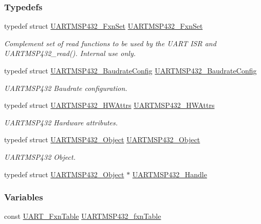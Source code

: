 \subsubsection*{Typedefs}
\begin{DoxyCompactItemize}
\item 
typedef struct \hyperlink{struct_u_a_r_t_m_s_p432___fxn_set}{U\+A\+R\+T\+M\+S\+P432\+\_\+\+Fxn\+Set} \hyperlink{_u_a_r_t_m_s_p432_8h_abe16bba058f09acef62973f6bb9498d5}{U\+A\+R\+T\+M\+S\+P432\+\_\+\+Fxn\+Set}
\begin{DoxyCompactList}\small\item\em Complement set of read functions to be used by the U\+A\+R\+T I\+S\+R and U\+A\+R\+T\+M\+S\+P432\+\_\+read(). Internal use only. \end{DoxyCompactList}\item 
typedef struct \hyperlink{struct_u_a_r_t_m_s_p432___baudrate_config}{U\+A\+R\+T\+M\+S\+P432\+\_\+\+Baudrate\+Config} \hyperlink{_u_a_r_t_m_s_p432_8h_a928164bf503e9f2e23b9ed0c0f4a0ae7}{U\+A\+R\+T\+M\+S\+P432\+\_\+\+Baudrate\+Config}
\begin{DoxyCompactList}\small\item\em U\+A\+R\+T\+M\+S\+P432 Baudrate configuration. \end{DoxyCompactList}\item 
typedef struct \hyperlink{struct_u_a_r_t_m_s_p432___h_w_attrs}{U\+A\+R\+T\+M\+S\+P432\+\_\+\+H\+W\+Attrs} \hyperlink{_u_a_r_t_m_s_p432_8h_aa0eb8afac37f3295fff965a57465d353}{U\+A\+R\+T\+M\+S\+P432\+\_\+\+H\+W\+Attrs}
\begin{DoxyCompactList}\small\item\em U\+A\+R\+T\+M\+S\+P432 Hardware attributes. \end{DoxyCompactList}\item 
typedef struct \hyperlink{struct_u_a_r_t_m_s_p432___object}{U\+A\+R\+T\+M\+S\+P432\+\_\+\+Object} \hyperlink{_u_a_r_t_m_s_p432_8h_a033bd8e3088bba16d5b001a647330d88}{U\+A\+R\+T\+M\+S\+P432\+\_\+\+Object}
\begin{DoxyCompactList}\small\item\em U\+A\+R\+T\+M\+S\+P432 Object. \end{DoxyCompactList}\item 
typedef struct \hyperlink{struct_u_a_r_t_m_s_p432___object}{U\+A\+R\+T\+M\+S\+P432\+\_\+\+Object} $\ast$ \hyperlink{_u_a_r_t_m_s_p432_8h_a507727808b1fc4b980a69bdf4ec54b53}{U\+A\+R\+T\+M\+S\+P432\+\_\+\+Handle}
\end{DoxyCompactItemize}
\subsubsection*{Variables}
\begin{DoxyCompactItemize}
\item 
const \hyperlink{struct_u_a_r_t___fxn_table}{U\+A\+R\+T\+\_\+\+Fxn\+Table} \hyperlink{_u_a_r_t_m_s_p432_8h_af8c4e502226de31497aa3aa8224ffd76}{U\+A\+R\+T\+M\+S\+P432\+\_\+fxn\+Table}
\end{DoxyCompactItemize}


